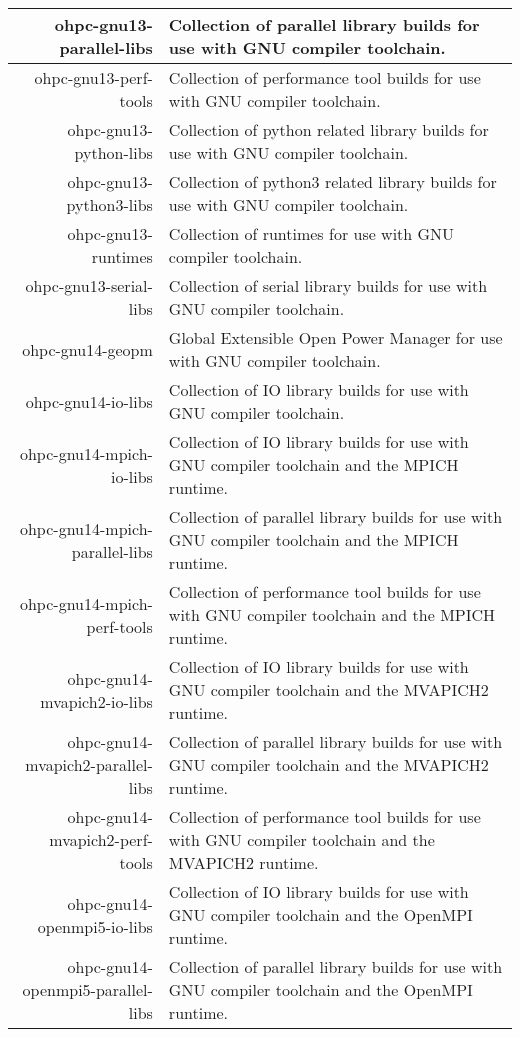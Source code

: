\begin{tabularx}{\textwidth}{r|X}
\hline
ohpc-gnu13-parallel-libs & Collection of parallel library builds for use with GNU compiler toolchain. \\
\hline
ohpc-gnu13-perf-tools & Collection of performance tool builds for use with GNU compiler toolchain. \\
\hline
ohpc-gnu13-python-libs & Collection of python related library builds for use with GNU compiler toolchain. \\
\hline
ohpc-gnu13-python3-libs & Collection of python3 related library builds for use with GNU compiler toolchain. \\
\hline
ohpc-gnu13-runtimes & Collection of runtimes for use with GNU compiler toolchain. \\
\hline
ohpc-gnu13-serial-libs & Collection of serial library builds for use with GNU compiler toolchain. \\
\hline
ohpc-gnu14-geopm & Global Extensible Open Power Manager for use with GNU compiler toolchain. \\
\hline
ohpc-gnu14-io-libs & Collection of IO library builds for use with GNU compiler toolchain. \\
\hline
ohpc-gnu14-mpich-io-libs & Collection of IO library builds for use with GNU compiler toolchain and the MPICH runtime. \\
\hline
ohpc-gnu14-mpich-parallel-libs & Collection of parallel library builds for use with GNU compiler toolchain and the MPICH runtime. \\
\hline
ohpc-gnu14-mpich-perf-tools & Collection of performance tool builds for use with GNU compiler toolchain and the MPICH runtime. \\
\hline
ohpc-gnu14-mvapich2-io-libs & Collection of IO library builds for use with GNU compiler toolchain and the MVAPICH2 runtime. \\
\hline
ohpc-gnu14-mvapich2-parallel-libs & Collection of parallel library builds for use with GNU compiler toolchain and the MVAPICH2 runtime. \\
\hline
ohpc-gnu14-mvapich2-perf-tools & Collection of performance tool builds for use with GNU compiler toolchain and the MVAPICH2 runtime. \\
\hline
ohpc-gnu14-openmpi5-io-libs & Collection of IO library builds for use with GNU compiler toolchain and the OpenMPI runtime. \\
\hline
ohpc-gnu14-openmpi5-parallel-libs & Collection of parallel library builds for use with GNU compiler toolchain and the OpenMPI runtime. \\

\end{tabularx}
